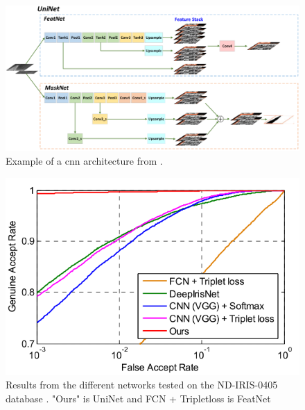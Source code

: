 \begin{figure}[H]
\centering
\includegraphics[width=\textwidth]{figures/Zhao2017_CNN_model.png} 
\caption{Example of a \gls{cnn} architecture  from \cite{Zhao2017}.}
\label{fig:Zhao2017_CNN_model}
\end{figure}

\begin{figure}[H]
\centering
\includegraphics[width=\textwidth]{figures/Zhao2017_CNN_results} 
\caption{Results from the different networks tested on the ND-IRIS-0405 database  \cite{Zhao2017}. "Ours" is UniNet and FCN + Tripletloss is FeatNet}
\label{fig:Zhao2017_CNN_results}
\end{figure}


